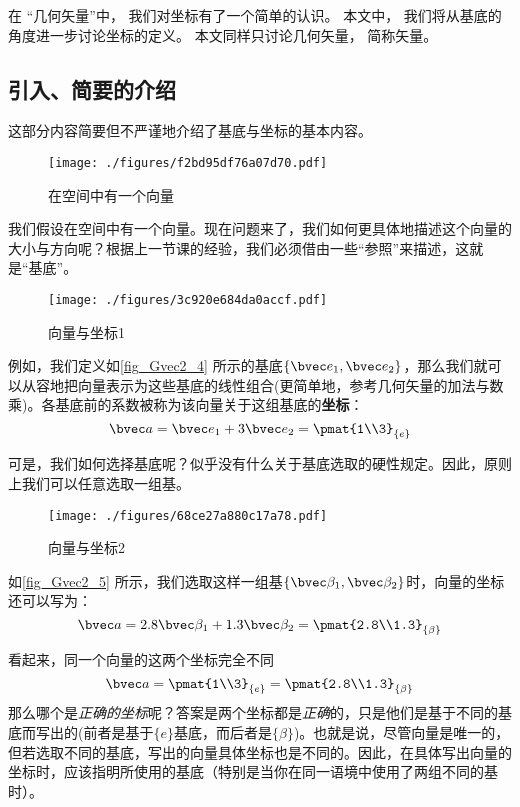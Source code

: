 

在 “几何矢量”中， 我们对坐标有了一个简单的认识。 本文中， 我们将从基底的角度进一步讨论坐标的定义。 本文同样只讨论几何矢量， 简称矢量。

\subsection{引入、简要的介绍}
这部分内容简要但不严谨地介绍了基底与坐标的基本内容。
\begin{figure}[ht]
\centering
\texttt{[image: ./figures/f2bd95df76a07d70.pdf]}
\caption{在空间中有一个向量} \label{fig_Gvec2_3}
\end{figure}

我们假设在空间中有一个向量。现在问题来了，我们如何更具体地描述这个向量的大小与方向呢？根据上一节课的经验，我们必须借由一些“参照”来描述，这就是“基底”。

\begin{figure}[ht]
\centering
\texttt{[image: ./figures/3c920e684da0accf.pdf]}
\caption{向量与坐标1} \label{fig_Gvec2_4}
\end{figure}
例如，我们定义如\autoref{fig_Gvec2_4} 所示的基底$\{\bvec e_1,\bvec e_2\}$，那么我们就可以从容地把向量表示为这些基底的线性组合(更简单地，参考几何矢量的加法与数乘)。各基底前的系数被称为该向量关于这组基底的\textbf{坐标}：
$$\bvec a = \bvec e_1 + 3\bvec e_2=
\pmat{1\\3}_{\{e\}}$$

可是，我们如何选择基底呢？似乎没有什么关于基底选取的硬性规定。因此，原则上我们可以任意选取一组基。
\begin{figure}[ht]
\centering
\texttt{[image: ./figures/68ce27a880c17a78.pdf]}
\caption{向量与坐标2} \label{fig_Gvec2_5}
\end{figure}
如\autoref{fig_Gvec2_5} 所示，我们选取这样一组基$\{\bvec \beta_1,\bvec \beta_2\}$时，向量的坐标还可以写为：
$$\bvec a = 2.8 \bvec \beta_1 + 1.3 \bvec \beta_2=
\pmat{2.8\\1.3}_{\{\beta\}}$$

看起来，同一个向量的这两个坐标完全不同
$$\bvec a = \pmat{1\\3}_{\{e\}} =
\pmat{2.8\\1.3}_{\{\beta\}}$$
那么哪个是\textsl{正确的坐标}呢？答案是两个坐标都是\textsl{正确}的，只是他们是基于不同的基底而写出的(前者是基于$\{e\}$基底，而后者是$\{\beta\}$)。也就是说，尽管向量是唯一的，但若选取不同的基底，写出的向量具体坐标也是不同的。因此，在具体写出向量的坐标时，应该指明所使用的基底（特别是当你在同一语境中使用了两组不同的基时）。

